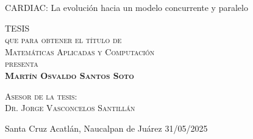\documentclass[
    fontsize=11pt,
    a4paper
   ]{scrbook}
\begin{document}
\begin{titlepage}
\begin{minipage}[c][0.81\textheight][t]{0.65\textwidth}
\begin{center}
                {\Huge CARDIAC: La evolución hacia un modelo concurrente y paralelo}\\[.3in]

                \vspace{2cm}            

                \textsc{\LARGE TESIS}\\[0.5cm]
                \textsc{\large que para obtener el título de}\\[0.5cm]
                \textsc{\large Matemáticas Aplicadas y Computación}\\[0.5cm]
                \textsc{\large presenta}\\[0.5cm]
                \textsc{\large \textbf{Martín Osvaldo Santos Soto}}\\[2cm]          

                \vspace{0.5cm}

                {\large\scshape Asesor de la tesis:\\[0.3cm] {Dr. Jorge Vasconcelos Santillán}}\\[.2in]

                \vspace{0.5cm}

                {Santa Cruz Acatlán, Naucalpan de Juárez}{ }{31/05/2025}
            \end{center}
        \end{minipage}
    \end{titlepage}
\end{document}
